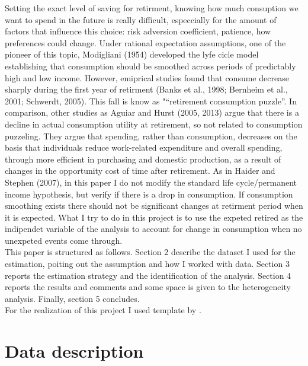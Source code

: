 \documentclass[11pt, a4paper, leqno]{article}
\begin{document}
Setting the exact level of saving for retirment, knowing how much consuption we want to spend in the future is really difficult, especcially for the amount of factors that influence this choice: risk adversion coefficient, patience, how preferences could change. Under rational expectation assumptions, one of the pioneer of this topic, Modigliani (1954) developed the lyfe cicle model establishing that consumption should be smoothed across periods of predictably high and low income. However, emiprical studies found that consume decrease sharply during the first year of retirment (Banks et al., 1998; Bernheim et al., 2001; Schwerdt, 2005). This fall is know as "“retirement consumption puzzle”. In comparison, other studies as Aguiar and Hurst (2005, 2013) argue that there is a decline in actual consumption utility at retirement, so not related to consumption puzzeling. They argue that spending, rather than consumption, decreases on the basis that individuals reduce work-related expenditure and overall spending, through more efficient in purchasing and domestic production, as a result of changes in the opportunity cost of time after retirement.
As in Haider and Stephen (2007), in this paper I do not modify the standard life cycle/permanent income hypothesis, but verify if there is a drop in consumption. If consumption smoothing exists there should not be significant changes at retirment period when it is expected. What I try to do in this project is to use the expeted retired as the indipendet variable of the analysis to account for change in consumption when no unexpeted events come through.
\\\hspace*{4mm}  This paper is structured as follows. Section 2 describe the dataset I used for the estimation, poiting out the assumption and how I worked with data. Section 3 reports the estimation strategy and the identification of the analysis. Section 4 reports the results and comments and some space is given to the heterogeneity analysis. Finally, section 5 concludes.
\\\hspace*{4mm}  For the realization of this project I used template by \citet{GaudeckerEconProjectTemplates}.

\section{Data description}
\label{sec:data-description}
\end{document}

